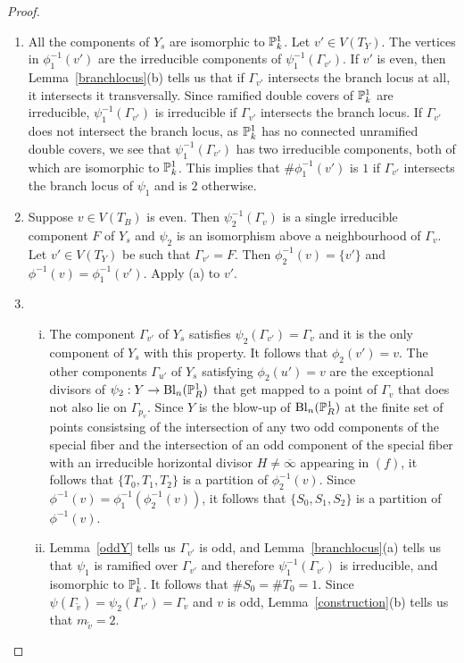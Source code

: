 \begin{proof} \hfill
\begin{enumerate}[\upshape (a)]
 \item All the components of $Y_s$ are isomorphic to $\P^1_k$. Let $v' \in V(T_Y)$. The vertices in $\phi_1^{-1}(v')$ are the irreducible components of $\psi_1^{-1}(\Gamma_{v'})$. If $v'$ is even, then Lemma~\ref{branchlocus}(b) tells us that if $\Gamma_{v'}$ intersects the branch locus at all, it intersects it transversally. Since ramified double covers of $\P^1_k$ are irreducible,  $\psi_1^{-1}(\Gamma_{v'})$ is irreducible if $\Gamma_{v'}$ intersects the branch locus. If $\Gamma_{v'}$ does not intersect the branch locus, as $\P^1_k$ has no connected unramified double covers, we see that $\psi_1^{-1}(\Gamma_{v'})$ has two irreducible components, both of which are isomorphic to $\P^1_k$. This implies that $\# \phi_1^{-1}(v')$ is $1$ if $\Gamma_{v'}$ intersects the branch locus of $\psi_1$ and is $2$ otherwise. 
 
 \item Suppose $v \in V(T_B)$ is even. Then $\psi_2^{-1}(\Gamma_v)$ is a single irreducible component $F$ of $Y_s$ and $\psi_2$ is an isomorphism above a neighbourhood of $\Gamma_v$. Let $v' \in V(T_Y)$ be such that $\Gamma_{v'} = F$. Then $\phi_2^{-1}(v) = \{ v' \}$ and $\phi^{-1}(v) = \phi_1^{-1}(v')$. Apply (a) to $v'$.
 
 \item 
 \begin{enumerate}[(i)]
  \item The component $\Gamma_{v'}$ of $Y_s$ satisfies $\psi_2(\Gamma_{v'}) = \Gamma_{v}$ and it is the only component of $Y_s$ with this property. It follows that $\phi_2(v') = v$. The other components $\Gamma_{u'}$ of $Y_s$ satisfying $\phi_2(u') = v$ are the exceptional divisors of $\psi_2: Y \rightarrow \mathrm{Bl}_n(\P^1_R)$ that get mapped to a point of $\Gamma_v$ that does not also lie on $\Gamma_{p_v}$. Since $Y$ is the blow-up of $\mathrm{Bl}_n(\P^1_R)$ at the finite set of points consistsing of the intersection of any two odd components of the special fiber and the intersection of an odd component of the special fiber with an irreducible horizontal divisor $H \neq \overline{\infty}$ appearing in $(f)$, it  follows that $\{ T_0,T_1,T_2 \}$ is a partition of $\phi_2^{-1}(v)$. Since $\phi^{-1}(v) = \phi_1^{-1}(\phi_2^{-1}(v))$, it follows that $\{ S_0,S_1,S_2 \}$ is a partition of $\phi^{-1}(v)$.
  
  \item Lemma~\ref{oddY} tells us $\Gamma_{v'}$ is odd, and Lemma~\ref{branchlocus}(a) tells us that $\psi_1$ is ramified over $\Gamma_{v'}$ and therefore $\psi_1^{-1}(\Gamma_{v'})$ is irreducible, and isomorphic to $\P^1_k$. It follows that $\# S_0 = \# T_0 = 1$. Since $\psi(\Gamma_{\tilde{v}}) = \psi_2(\Gamma_{v'}) = \Gamma_v$ and $v$ is odd, Lemma~\ref{construction}(b) tells us that $m_{\tilde{v}} = 2$. 
  

\end{enumerate}
\end{enumerate}
\end{proof}
